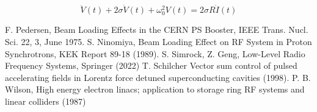 \documentclass[book]{jlreq}
\begin{document}
%
\begin{equation}
    \ddot{V}(t) + 2 \sigma \dot{V}(t) + \omega_0^2 V(t) = 2\sigma R \dot{I}(t)
\end{equation}
%
\begin{thebibliography}{9}
    F. Pedersen, Beam Loading Effects in the CERN PS Booster, IEEE Trans. Nucl. Sci. 22, 3, June 1975.
    S. Ninomiya, Beam Loading Effect on RF System in Proton Synchrotrons, KEK Report 89-18 (1989).
    S. Simrock, Z. Geng, Low-Level Radio Frequency Systems, Springer (2022)
    T. Schilcher Vector sum control of pulsed accelerating fields in Lorentz force detuned superconducting cavities (1998).
    P. B. Wilson, High energy electron linacs; application to storage ring RF systems and linear colliders (1987)
\end{thebibliography}
%
%
\end{document}
